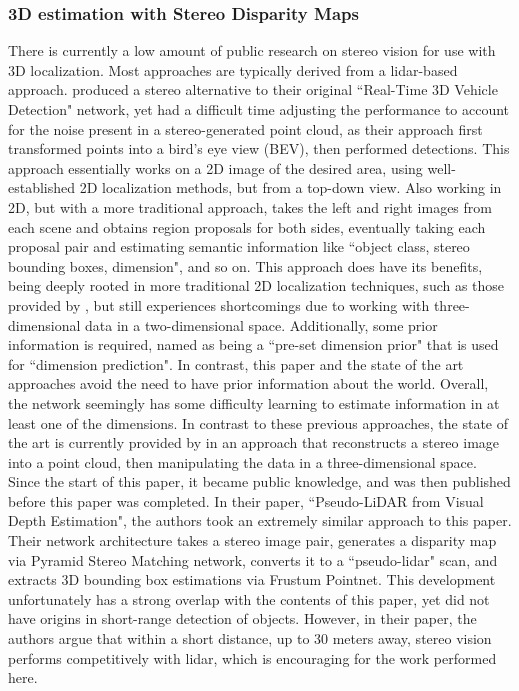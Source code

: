 \subsubsection{3D estimation with Stereo Disparity Maps}
There is currently a low amount of public research on stereo vision for use with 3D localization. Most approaches are typically derived from a lidar-based approach. \cite{zeng2018rt3d} produced a stereo alternative to their original ``Real-Time 3D Vehicle Detection" network, yet had a difficult time adjusting the performance to account for the noise present in a stereo-generated point cloud, as their approach first transformed points into a bird's eye view (BEV), then performed detections. This approach essentially works on a 2D image of the desired area, using well-established 2D localization methods, but from a top-down view. Also working in 2D, but with a more traditional approach, \cite{li_stereo_2019} takes the left and right images from each scene and obtains region proposals for both sides, eventually taking each proposal pair and estimating semantic information like ``object class, stereo bounding boxes, dimension", and so on. This approach does have its benefits, being deeply rooted in more traditional 2D localization techniques, such as those provided by \cite{ren_faster_2015}, but still experiences shortcomings due to working with three-dimensional data in a two-dimensional space. Additionally, some prior information is required, named as being a ``pre-set dimension prior" that is used for ``dimension prediction". In contrast, this paper and the state of the art approaches avoid the need to have prior information about the world. Overall, the network seemingly has some difficulty learning to estimate information in at least one of the dimensions. In contrast to these previous approaches, the state of the art is currently provided by \cite{wang_pseudo-lidar_2019} in an approach that reconstructs a stereo image into a point cloud, then manipulating the data in a three-dimensional space. Since the start of this paper, it became public knowledge, and was then published before this paper was completed. In their paper, ``Pseudo-LiDAR from Visual Depth Estimation", the authors took an extremely similar approach to this paper. Their network architecture takes a stereo image pair, generates a disparity map via Pyramid Stereo Matching network, converts it to a ``pseudo-lidar" scan, and extracts 3D bounding box estimations via Frustum Pointnet. This development unfortunately has a strong overlap with the contents of this paper, yet did not have origins in short-range detection of objects. However, in their paper, the authors argue that within a short distance, up to 30 meters away, stereo vision performs competitively with lidar, which is encouraging for the work performed here.

